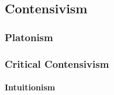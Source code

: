 \subsection{Contensivism}\label{sec:contensivism}

\subsubsection{Platonism}\label{sec:platonism}

\subsubsection{Critical Contensivism}\label{sec:critical_contensivism}

\paragraph{Intuitionism}\label{sec:intuitionism}

